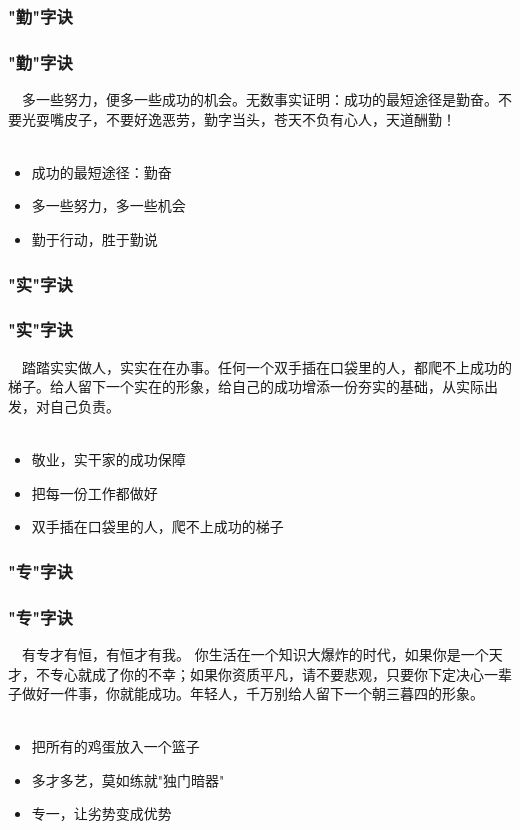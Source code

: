 \subsubsection{"勤"字诀}
\begin{frame}
\frametitle{"勤"字诀}
\noindent\handr~~多一些努力，便多一些成功的机会。无数事实证明：成功的最短途径是勤奋。不要光耍嘴皮子，不要好逸恶劳，勤字当头，苍天不负有心人，天道酬勤！
~\\
~\\
\begin{itemize}
    \item 成功的最短途径：勤奋
    \item 多一些努力，多一些机会
    \item 勤于行动，胜于勤说
\end{itemize}
\end{frame}

\subsubsection{"实"字诀}
\begin{frame}
\frametitle{"实"字诀}
\noindent\handr~~踏踏实实做人，实实在在办事。任何一个双手插在口袋里的人，都爬不上成功的梯子。给人留下一个实在的形象，给自己的成功增添一份夯实的基础，从实际出发，对自己负责。
~\\
~\\
\begin{itemize}
    \item 敬业，实干家的成功保障
    \item 把每一份工作都做好
    \item 双手插在口袋里的人，爬不上成功的梯子
\end{itemize}
\end{frame}

\subsubsection{"专"字诀}
\begin{frame}
\frametitle{"专"字诀}
\noindent\handr~~有专才有恒，有恒才有我。 你生活在一个知识大爆炸的时代，如果你是一个天才，不专心就成了你的不幸；如果你资质平凡，请不要悲观，只要你下定决心一辈子做好一件事，你就能成功。年轻人，千万别给人留下一个朝三暮四的形象。
~\\
~\\
\begin{itemize}
    \item 把所有的鸡蛋放入一个篮子
    \item 多才多艺，莫如练就"独门暗器"
    \item 专一，让劣势变成优势
\end{itemize}
\end{frame}

